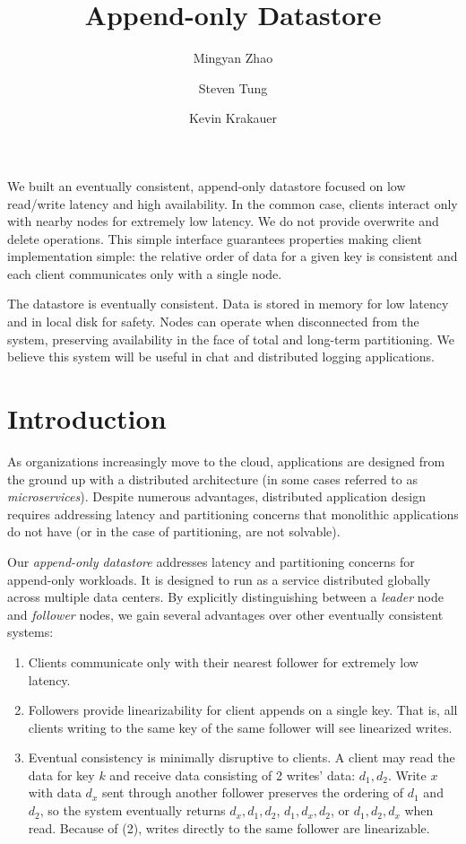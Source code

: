 \documentclass[11pt,english,twocolumn]{article}
\title{Append-only Datastore}
\author{
	Mingyan Zhao
	\and
	Steven Tung
	\and
	Kevin Krakauer
}
\date{}
\begin{document}
\maketitle


\section*{}
We built an eventually consistent, append-only datastore focused on low
read/write latency and high availability. In the common case, clients interact
only with nearby nodes for extremely low latency. We do not provide overwrite
and delete operations. This simple interface guarantees properties making client
implementation simple: the relative order of data for a given key is consistent
and each client communicates only with a single node.

The datastore is eventually consistent. Data is stored in memory for low latency
and in local disk for safety. Nodes can operate when disconnected from the
system, preserving availability in the face of total and long-term partitioning.
We believe this system will be useful in chat and distributed logging
applications.

\section{Introduction}
As organizations increasingly move to the cloud, applications are designed from
the ground up with a distributed architecture (in some cases referred to as
\textit{microservices}). Despite numerous advantages, distributed
application design requires addressing latency and partitioning concerns that
monolithic applications do not have (or in the case of partitioning, are not
solvable).

Our \textit{append-only datastore} addresses latency and partitioning concerns
for append-only workloads. It is designed to run as a service distributed
globally across multiple data centers. By explicitly distinguishing between a
\textit{leader} node and \textit{follower} nodes, we gain several advantages
over other eventually consistent systems:

\begin{enumerate}
	\item Clients communicate only with their nearest follower for extremely
		low latency.
	\item Followers provide linearizability for client appends on a single
		key. That is, all clients writing to the same key of the same
		follower will see linearized writes.
	\item Eventual consistency is minimally disruptive to clients. A client
		may read the data for key $k$ and receive data consisting of 2
		writes' data: $d_1, d_2$. Write $x$ with data $d_x$ sent through another follower
		preserves the ordering of $d_1$ and $d_2$, so the system
		eventually returns $d_x, d_1, d_2$, $d_1, d_x, d_2$, or $d_1,
		d_2, d_x$ when read.  Because of (2), writes directly to the
		same follower are linearizable.
\end{enumerate}
\end{document}

